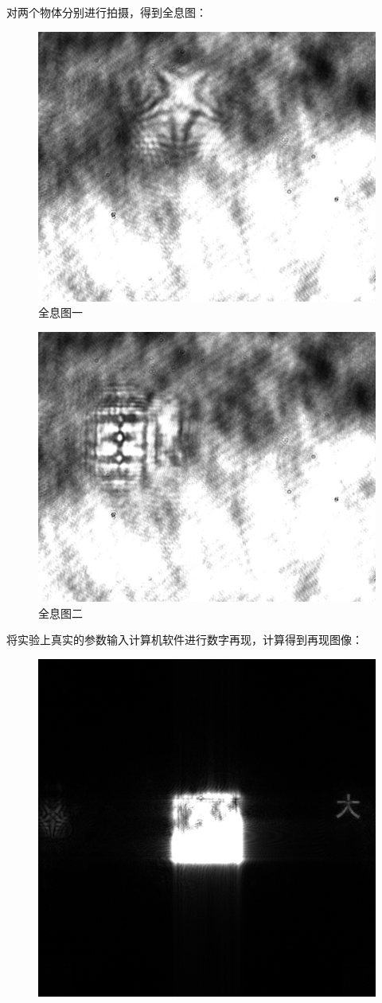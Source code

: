 \documentclass{WHUReport}
\begin{document}
\begin{multicols}{2}
	对两个物体分别进行拍摄，得到全息图：
	\begin{figure}[H]
		\centering
		\includegraphics[width=.8\linewidth]{figs/1.png}
		\caption{全息图一}
		\label{fig1}
	\end{figure}
	\begin{figure}[H]
		\centering
		\includegraphics[width=.8\linewidth]{figs/2.png}
		\caption{全息图二}
		\label{fig2}
	\end{figure}
	将实验上真实的参数输入计算机软件进行数字再现，计算得到再现图像：
	\begin{figure}[H]
		\centering
		\includegraphics[width=.8\linewidth]{figs/3.png}

\end{figure}
\end{multicols}
\end{document}
